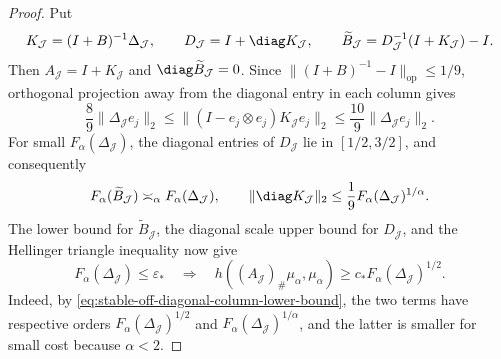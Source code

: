 \begin{proof}
Put
\[
 K_{\mathcal J}=(I+B)^{-1}\Delta_{\mathcal J},
 \qquad
 D_{\mathcal J}=I+\diag K_{\mathcal J},
 \qquad
 \widetilde B_{\mathcal J}=D_{\mathcal J}^{-1}(I+K_{\mathcal J})-I.
\]
Then \(A_{\mathcal J}=I+K_{\mathcal J}\) and
\(\diag\widetilde B_{\mathcal J}=0\).
Since \(\|(I+B)^{-1}-I\|_{\mathrm{op}}\le1/9\), orthogonal projection
away from the diagonal entry in each column gives
\[
 \frac89\|\Delta_{\mathcal J}e_j\|_2
 \le\|(I-e_j\otimes e_j)K_{\mathcal J}e_j\|_2
 \le\frac{10}{9}\|\Delta_{\mathcal J}e_j\|_2.
\]
For small \(F_\alpha(\Delta_{\mathcal J})\), the diagonal entries of
\(D_{\mathcal J}\) lie in
\([1/2,3/2]\), and consequently
\begin{equation}
 F_\alpha(\widetilde B_{\mathcal J})\asymp_\alpha F_\alpha(\Delta_{\mathcal J}),
 \qquad
 \|\diag K_{\mathcal J}\|_2
 \le\frac19F_\alpha(\Delta_{\mathcal J})^{1/\alpha}.
 \label{eq:stable-finite-cut-comparison}
\end{equation}
The lower bound for \(\widetilde B_{\mathcal J}\), the diagonal scale upper
bound for \(D_{\mathcal J}\), and the Hellinger triangle inequality now give
\begin{equation}
 F_\alpha(\Delta_{\mathcal J})\le\varepsilon_*
 \quad\Longrightarrow\quad
 h((A_{\mathcal J})_\#\mu_\alpha,\mu_\alpha)
 \ge c_*F_\alpha(\Delta_{\mathcal J})^{1/2}.
 \label{eq:stable-finite-cut-lower-bound}
\end{equation}
Indeed, by \eqref{eq:stable-off-diagonal-column-lower-bound}, the two terms
have respective orders
\(F_\alpha(\Delta_{\mathcal J})^{1/2}\) and
\(F_\alpha(\Delta_{\mathcal J})^{1/\alpha}\), and the latter is smaller for small
cost because \(\alpha<2\).


\end{proof}
